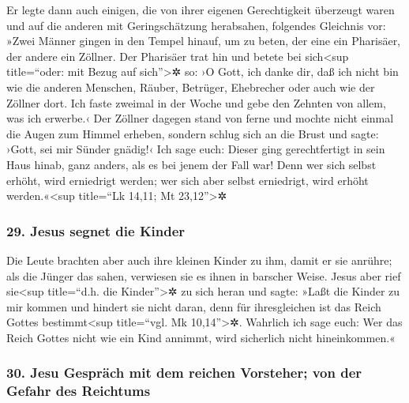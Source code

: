  Er legte dann auch einigen, die von ihrer eigenen
Gerechtigkeit überzeugt waren und auf die anderen mit Geringschätzung
herabsahen, folgendes Gleichnis vor:  »Zwei Männer gingen
in den Tempel hinauf, um zu beten, der eine ein Pharisäer, der andere
ein Zöllner.  Der Pharisäer trat hin und betete bei
sich\textless sup title=``oder: mit Bezug auf sich''\textgreater✲ so: ›O
Gott, ich danke dir, daß ich nicht bin wie die anderen Menschen, Räuber,
Betrüger, Ehebrecher oder auch wie der Zöllner dort.  Ich
faste zweimal in der Woche und gebe den Zehnten von allem, was ich
erwerbe.‹  Der Zöllner dagegen stand von ferne und mochte
nicht einmal die Augen zum Himmel erheben, sondern schlug sich an die
Brust und sagte: ›Gott, sei mir Sünder gnädig!‹  Ich sage
euch: Dieser ging gerechtfertigt in sein Haus hinab, ganz anders, als es
bei jenem der Fall war! Denn wer sich selbst erhöht, wird erniedrigt
werden; wer sich aber selbst erniedrigt, wird erhöht
werden.«\textless sup title=``Lk 14,11; Mt 23,12''\textgreater✲

\hypertarget{jesus-segnet-die-kinder}{%
\subsubsection{29. Jesus segnet die
Kinder}\label{jesus-segnet-die-kinder}}

 Die Leute brachten aber auch ihre kleinen Kinder zu ihm,
damit er sie anrühre; als die Jünger das sahen, verwiesen sie es ihnen
in barscher Weise.  Jesus aber rief sie\textless sup
title=``d.h. die Kinder''\textgreater✲ zu sich heran und sagte: »Laßt
die Kinder zu mir kommen und hindert sie nicht daran, 
denn für ihresgleichen ist das Reich Gottes bestimmt\textless sup
title=``vgl. Mk 10,14''\textgreater✲. Wahrlich ich sage euch: Wer das
Reich Gottes nicht wie ein Kind annimmt, wird sicherlich nicht
hineinkommen.«

\hypertarget{jesu-gespruxe4ch-mit-dem-reichen-vorsteher-von-der-gefahr-des-reichtums}{%
\subsubsection{30. Jesu Gespräch mit dem reichen Vorsteher; von der
Gefahr des
Reichtums}\label{jesu-gespruxe4ch-mit-dem-reichen-vorsteher-von-der-gefahr-des-reichtums}}

